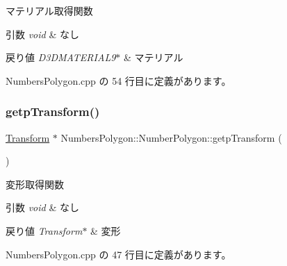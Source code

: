 マテリアル取得関数 


\begin{DoxyParams}{引数}
{\em void} & なし \\
\hline
\end{DoxyParams}

\begin{DoxyRetVals}{戻り値}
{\em D3\+D\+M\+A\+T\+E\+R\+I\+A\+L9$\ast$} & マテリアル \\
\hline
\end{DoxyRetVals}


 Numbers\+Polygon.\+cpp の 54 行目に定義があります。

\mbox{\label{class_numbers_polygon_1_1_number_polygon_adbbd23d716cb041a0ab1c1f71e7a2cc9}} 
\subsubsection{\texorpdfstring{getp\+Transform()}{getpTransform()}}
{\footnotesize\ttfamily \mbox{\hyperlink{class_transform}{Transform}} $\ast$ Numbers\+Polygon\+::\+Number\+Polygon\+::getp\+Transform (\begin{DoxyParamCaption}{ }\end{DoxyParamCaption})}



変形取得関数 


\begin{DoxyParams}{引数}
{\em void} & なし \\
\hline
\end{DoxyParams}

\begin{DoxyRetVals}{戻り値}
{\em Transform$\ast$} & 変形 \\
\hline
\end{DoxyRetVals}


 Numbers\+Polygon.\+cpp の 47 行目に定義があります。

\mbox{\label{class_numbers_polygon_1_1_number_polygon_af4d9476caf03b0cb7971d66361b61fdb}} 
